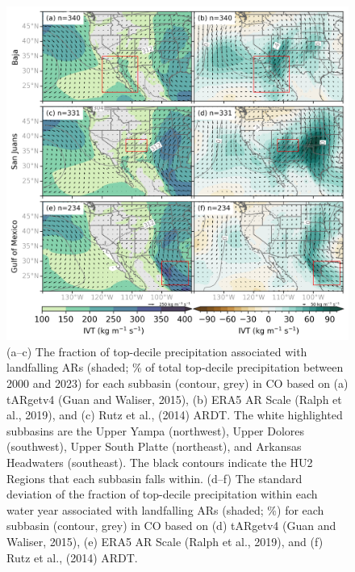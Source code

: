 \documentclass[draft]{agujournal2019}
\begin{document}
\begin{figure}
\noindent\includegraphics[width=\textwidth, height=\textheight, keepaspectratio]{fig7.png}
\caption{(a–c) The fraction of top-decile precipitation associated with landfalling ARs (shaded; \% of total top-decile precipitation between 2000 and 2023) for each subbasin (contour, grey) in CO based on (a) tARgetv4 (Guan and Waliser, 2015), (b) ERA5 AR Scale (Ralph et al., 2019), and (c) Rutz et al., (2014) ARDT. The white highlighted subbasins are the Upper Yampa (northwest), Upper Dolores (southwest), Upper South Platte (northeast), and Arkansas Headwaters (southeast). The black contours indicate the HU2 Regions that each subbasin falls within. (d–f) The standard deviation of the fraction of top-decile precipitation within each water year associated with landfalling ARs (shaded; \%) for each subbasin (contour, grey) in CO based on (d)  tARgetv4 (Guan and Waliser, 2015), (e) ERA5 AR Scale (Ralph et al., 2019), and (f) Rutz et al., (2014) ARDT. }
\label{fig:choropleth}
\end{figure}
\end{document}
